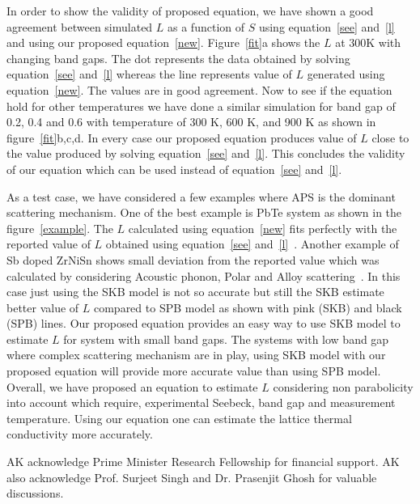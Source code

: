 \documentclass[%
 aip,
 amsmath,amssymb,
reprint, onecolumn %
]{revtex4-1}
\begin{document}
In order to show the validity of proposed equation, we have shown a good agreement between simulated $L$ as a function of $S$ using equation~\ref{see} and~\ref{l} and using our proposed equation~\ref{new}. Figure~\ref{fit}a shows the $L$ at 300K with changing band gaps. The dot represents the data obtained by solving equation~\ref{see} and~\ref{l} whereas the line represents value of $L$ generated using equation~\ref{new}. The values are in good agreement. Now to see if the equation hold for other temperatures we have done a similar simulation for band gap of 0.2, 0.4 and 0.6 with temperature of 300 K, 600 K, and 900 K as shown in figure~\ref{fit}b,c,d. In every case our proposed equation produces value of $L$ close to the value produced by solving equation~\ref{see} and~\ref{l}. This concludes the validity of our equation which can be used instead of equation~\ref{see} and~\ref{l}.
 
As a test case, we have considered a few examples where APS is the dominant scattering mechanism. One of the best example is PbTe system as shown in the figure~\ref{example}. The $L$ calculated using equation~\ref{new} fits perfectly with the reported value of $L$ obtained using equation~\ref{see} and~\ref{l}~\cite{lalonde2011reevaluation}. Another example of Sb doped ZrNiSn shows small deviation from the reported value which was calculated by considering Acoustic phonon, Polar and Alloy scattering~\cite{xie2014intrinsic}. In this case just using the SKB model is not so accurate but still the SKB estimate better value of $L$ compared to SPB model as shown with pink (SKB) and black (SPB) lines. Our proposed equation provides an easy way to use SKB model to estimate $L$ for system with small band gaps. The systems with low band gap where complex scattering mechanism are in play, using SKB model with our proposed equation will provide more accurate value than using SPB model. 
Overall, we have proposed an equation to estimate $L$ considering non parabolicity into account which require, experimental Seebeck, band gap and measurement temperature. Using our equation one can estimate the lattice thermal conductivity more accurately.

\newpage
\begin{acknowledgments}
AK acknowledge Prime Minister Research Fellowship for financial support. AK also acknowledge Prof. Surjeet Singh and Dr. Prasenjit Ghosh for valuable discussions.
\end{acknowledgments}


\end{document}
